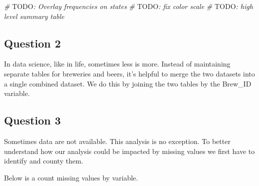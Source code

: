 \documentclass[]{article}
\newenvironment{Shaded}{\begin{snugshade}}{\end{snugshade}}
\newcommand{\KeywordTok}[1]{\textcolor[rgb]{0.13,0.29,0.53}{\textbf{#1}}}
\newcommand{\DataTypeTok}[1]{\textcolor[rgb]{0.13,0.29,0.53}{#1}}
\newcommand{\StringTok}[1]{\textcolor[rgb]{0.31,0.60,0.02}{#1}}
\newcommand{\CommentTok}[1]{\textcolor[rgb]{0.56,0.35,0.01}{\textit{#1}}}
\newcommand{\ControlFlowTok}[1]{\textcolor[rgb]{0.13,0.29,0.53}{\textbf{#1}}}
\newcommand{\OperatorTok}[1]{\textcolor[rgb]{0.81,0.36,0.00}{\textbf{#1}}}
\newcommand{\AlertTok}[1]{\textcolor[rgb]{0.94,0.16,0.16}{#1}}
\newcommand{\NormalTok}[1]{#1}
\begin{document}
\begin{Shaded}
\begin{Highlighting}[]
\CommentTok{# }\AlertTok{TODO}\CommentTok{: Overlay frequencies on states}
\CommentTok{# }\AlertTok{TODO}\CommentTok{: fix color scale}
\CommentTok{# }\AlertTok{TODO}\CommentTok{: high level summary table}
\end{Highlighting}
\end{Shaded}

\subsection{Question 2}\label{question-2}

In data science, like in life, sometimes less is more. Instead of
maintaining separate tables for breweries and beers, it's helpful to
merge the two datasets into a single combined dataset. We do this by
joining the two tables by the Brew\_ID variable.

\begin{Shaded}
\end{Shaded}

\subsection{Question 3}\label{question-3}

Sometimes data are not available. This analysis is no exception. To
better understand how our analysis could be impacted by missing values
we first have to identify and county them.

Below is a count missing values by variable.

\begin{Shaded}
\end{Shaded}
\end{document}

